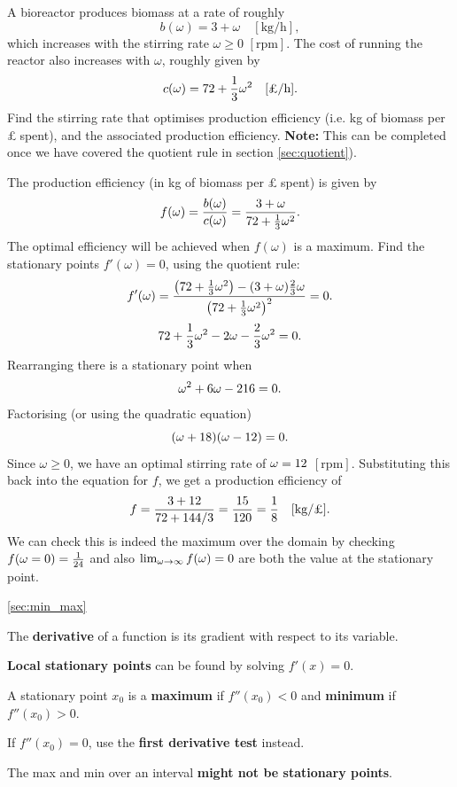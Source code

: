 \goodbreak
\begin{example}[Video]
A bioreactor produces biomass at a rate of roughly
\[
b(\omega)=3+\omega \quad [\mathrm{kg/h}],
\]
which increases with the stirring rate $\omega\geq0$ $[\mathrm{rpm}]$.
The cost of running the reactor also increases with $\omega$, roughly given by
\[
c(\omega)=72+\frac{1}{3}\omega^2 \quad [\text{\pounds}/\mathrm{h}].
\]
Find the stirring rate that optimises production efficiency (i.e. kg of biomass per \pounds$\;$spent), and the associated production efficiency.
\textbf{Note:} This can be completed once we have covered the quotient rule in section \ref{sec:quotient}).
\end{example}
%
\begin{solution}
The production efficiency (in kg of biomass per \pounds$\;$spent) is given by
\[
f(\omega)=\frac{b(\omega)}{c(\omega)}=\frac{3+\omega}{72+\frac{1}{3}\omega^2}.
\]
The optimal efficiency will be achieved when $f(\omega)$ is a maximum. Find the stationary points $f'(\omega)=0$, using the quotient rule:
\[
f'(\omega)=\frac{\left(72+\frac{1}{3}\omega^2\right)-(3+\omega)\frac{2}{3}\omega}{\left(72+\frac{1}{3}\omega^2\right)^2}=0.
\]
\[
72+\frac{1}{3}\omega^2-2\omega-\frac{2}{3}\omega^2=0.
\]
Rearranging there is a stationary point when
\[
\omega^2+6\omega-216=0.
\]
Factorising (or using the quadratic equation)
\[
(\omega+18)(\omega-12)=0.
\]
Since $\omega\geq0$, we have an optimal stirring rate of $\omega=12$ $[\mathrm{rpm}]$.
Substituting this back into the equation for $f$, we get a production efficiency of
\[
f=\blank{\frac{3+12}{72+144/3}=\frac{15}{120}=\frac{1}{8}}\quad [\mathrm{kg}/\text{\pounds}].
\]
We can check this is indeed the maximum over the domain by checking $f(\omega=0) = \frac{1}{24}$ and also $\lim_{\omega\to\infty}f(\omega) = 0$ are both  the value at the stationary point.
\end{solution}

\begin{recap}{\ref{sec:min_max}}
\item The \textbf{derivative} of a function is its gradient with respect to its variable.
\item \textbf{Local stationary points} can be found by solving $f'(x)=0$.
\item A stationary point $x_0$ is a \textbf{maximum} if $f''(x_0)<0$ and \textbf{minimum} if $f''(x_0)>0$.
\item If $f''(x_0)=0$, use the \textbf{first derivative test} instead.
\item The max and min over an interval \textbf{might not be stationary points}.
\end{recap}


